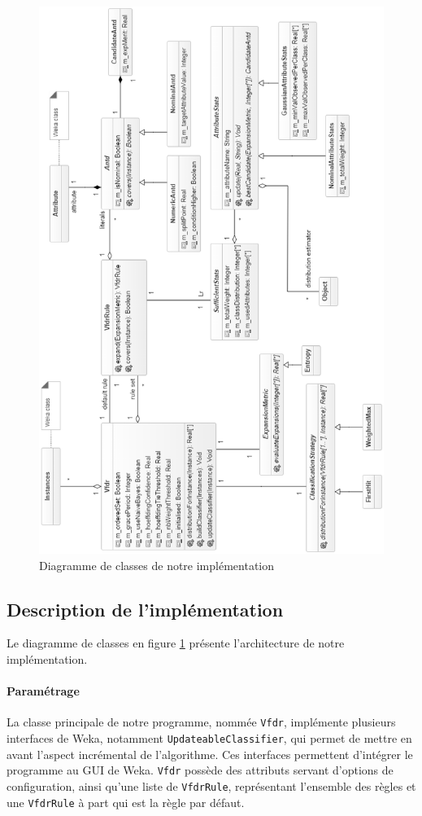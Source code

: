     \begin{figure}
        \includegraphics[width=\textwidth]{src/image2}
        \caption{Diagramme de classes de notre implémentation}
        \label{fig:dclass}
    \end{figure}


    \subsection{Description de l'implémentation}

        Le diagramme de classes en figure \ref{fig:dclass} présente l'architecture de notre implémentation.

        \paragraph{Paramétrage} La classe principale de notre programme, nommée \texttt{Vfdr}, implémente plusieurs interfaces de Weka, notamment \texttt{UpdateableClassifier}, qui permet de mettre en avant l’aspect incrémental de l’algorithme. Ces interfaces permettent d'intégrer le programme au GUI de Weka. \texttt{Vfdr} possède des attributs servant d’options de configuration, ainsi qu’une liste de \texttt{VfdrRule}, représentant l’ensemble des règles et une \texttt{VfdrRule} à part qui est la règle par défaut.

